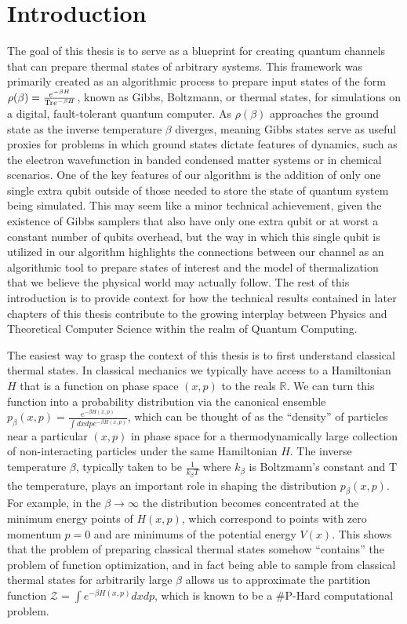 \chapter{Introduction}
The goal of this thesis is to serve as a blueprint for creating quantum channels that can prepare thermal states of arbitrary systems. This framework was primarily created as an algorithmic process to prepare input states of the form $\rho(\beta) = \frac{e^{-\beta H}}{{\rm Tr} e^{-\beta H}}$, known as Gibbs, Boltzmann, or thermal states, for simulations on a digital, fault-tolerant quantum computer. As $\rho(\beta)$ approaches the ground state as the inverse temperature $\beta$ diverges, meaning Gibbs states serve as useful proxies for problems in which ground states dictate features of dynamics, such as the electron wavefunction in banded condensed matter systems or in chemical scenarios. One of the key features of our algorithm is the addition of only one single extra qubit outside of those needed to store the state of quantum system being simulated. This may seem like a minor technical achievement, given the existence of Gibbs samplers that also have only one extra qubit or at worst a constant number of qubits overhead, but the way in which this single qubit is utilized in our algorithm highlights the connections between our channel as an algorithmic tool to prepare states of interest and the model of thermalization that we believe the physical world may actually follow. The rest of this introduction is to provide context for how the technical results contained in later chapters of this thesis contribute to the growing interplay between Physics and Theoretical Computer Science within the realm of Quantum Computing.

The easiest way to grasp the context of this thesis is to first understand classical thermal states. In classical mechanics we typically have access to a Hamiltonian $H$ that is a function on phase space $(x, p)$ to the reals $\mathbb{R}$. We can turn this function into a probability distribution via the canonical ensemble $p_\beta (x, p) = \frac{e^{- \beta H(x, p)}}{\int dx dp e^{-\beta H(x, p)}}$, which can be thought of as the ``density'' of particles near a particular $(x,p)$ in phase space for a thermodynamically large collection of non-interacting particles under the same Hamiltonian $H$. The inverse temperature $\beta$, typically taken to be $\frac{1}{k_\beta T}$ where $k_\beta$ is Boltzmann's constant and T the temperature, plays an important role in shaping the distribution $p_\beta(x,p)$. For example, in the $\beta \to \infty$ the distribution becomes concentrated at the minimum energy points of $H(x, p)$, which correspond to points with zero momentum $p=0$ and are minimums of the potential energy $V(x)$. This shows that the problem of preparing classical thermal states somehow ``contains'' the problem of function optimization, and in fact being able to sample from classical thermal states for arbitrarily large $\beta$ allows us to approximate the partition function $\mathcal{Z} = \int e^{-\beta H(x,p)} dx dp$, which is known to be a \#P-Hard computational problem.

